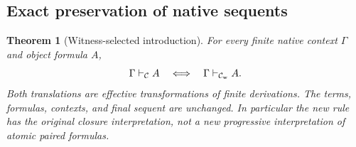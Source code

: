\documentclass[11pt,letterpaper]{article}
\newtheorem{theorem}{Theorem}[section]
\theoremstyle{definition}\newtheorem{definition}[theorem]{Definition}
\theoremstyle{remark}\newtheorem{remark}[theorem]{Remark}
\begin{document}
\subsection{Exact preservation of native sequents}

\begin{theorem}[Witness-selected introduction]
\label{thm:det-witness-equivalence}
For every finite native context $\Gamma$ and object formula $A$,
\[
 \Gamma\vdash_{\mathcal C} A
 \quad\Longleftrightarrow\quad
 \Gamma\vdash_{\mathcal C_{\rm w}} A.
\]
Both translations are effective transformations of finite derivations.
The terms, formulas, contexts, and final sequent are unchanged.  In
particular the new rule has the original closure interpretation, not a
new progressive interpretation of atomic paired formulas.
\end{theorem}
\end{document}
